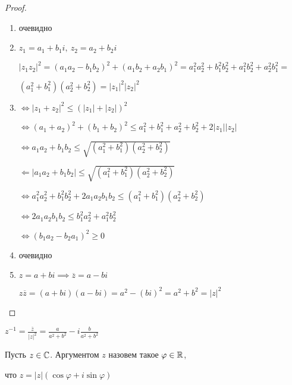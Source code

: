 \begin{proof}
    \begin{enumerate}
        \item очевидно
        
        \item $z_1 = a_1 + b_1i,~z_2 = a_2 + b_2i$
        
        $|z_1 z_2|^2 = (a_1 a_2 - b_1 b_2)^2 + (a_1 b_2 + a_2 b_1)^2 = a_1^2 a_2^2 + b_1^2 b_2^2 + a_1^2 b_2^2 + a_2^2 b_1^2 = $
        
        $(a_1^2 + b_1^2)(a_2^2 + b_2^2) = |z_1|^2|z_2|^2$
        
        \item $\iff |z_1 + z_2|^2 \leq (|z_1| + |z_2|)^2$
        
        $\iff (a_1 + a_2)^2 + (b_1 + b_2)^2 \leq a_1^2 + b_1^2 + a_2^2 + b_2^2 + 2|z_1||z_2|$
        
        $\iff a_1a_2 + b_1b_2 \leq \sqrt{(a_1^2 + b_1^2)(a_2^2 + b_2^2)}$
        
        $\Leftarrow |a_1 a_2 + b_1 b_2| \leq \sqrt{(a_1^2 + b_1^2)(a_2^2 + b_2^2)}$
        
        $\iff a_1^2 a_2^2 + b_1^2 b_2^2 + 2a_1a_2b_1b_2 \leq (a_1^2 + b_1^2)(a_2^2 + b_2^2)$
        
        $\iff 2a_1a_2b_1b_2 \leq b_1^2 a_2^2 + a_1^2 b_2^2$
        
        $\iff (b_1 a_2 - b_2 a_1)^2 \geq 0$

        \item очевидно
        
        \item $z = a + bi \implies \overline{z} = a - bi$
        
        $z \overline{z} = (a + bi)(a - bi) = a^2 - (bi)^2 = a^2 + b^2 = |z|^2$
    \end{enumerate}
\end{proof}

\begin{notice}
    $z^{-1} = \frac{\overline{z}}{|z|^2} = \frac{a}{a^2 + b^2} - i\frac{b}{a^2 + b^2}$
\end{notice}

\begin{defn}

    Пусть $z \in \mathbb{C}$. Аргументом $z$ назовем такое $\varphi \in \mathbb{R}$, 

    что $z = |z|(\cos\varphi + i\sin\varphi)$
\end{defn}

